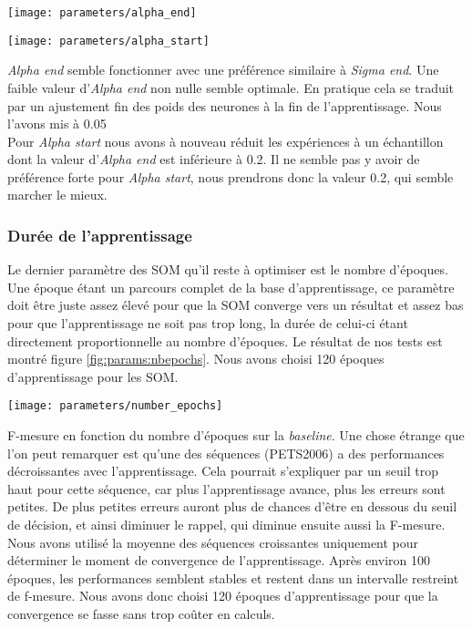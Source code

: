 	\begin{figureth}
		\begin{subfigureth}{.75\textwidth}
			\texttt{[image: parameters/alpha\_end]}	
		\end{subfigureth}
		\begin{subfigureth}{.75\textwidth}
			\texttt{[image: parameters/alpha\_start]}	
		\end{subfigureth}
		\caption[Optimisation d'$\alpha$]{\textit{Alpha end} semble fonctionner avec une préférence similaire à \textit{Sigma end}. Une faible valeur d'\textit{Alpha end} non nulle semble optimale. En pratique cela se traduit par un ajustement fin des poids des neurones à la fin de l'apprentissage. Nous l'avons mis à 0.05\\
		
		Pour \textit{Alpha start} nous avons à nouveau réduit les expériences à un échantillon dont la valeur d'\textit{Alpha end} est inférieure à 0.2. Il ne semble pas y avoir de préférence forte pour \textit{Alpha start}, nous prendrons donc la valeur 0.2, qui semble marcher le mieux.}\label{fig:params:alphaopt}
	\end{figureth}


	\subsubsection{Durée de l'apprentissage}

	Le dernier paramètre des SOM qu'il reste à optimiser est le nombre d'époques. Une époque étant un parcours complet de la base d'apprentissage, ce paramètre doit être juste assez élevé pour que la SOM converge vers un résultat et assez bas pour que l'apprentissage ne soit pas trop long, la durée de celui-ci étant directement proportionnelle au nombre d'époques. Le résultat de nos tests est montré figure \ref{fig:params:nbepochs}. Nous avons choisi 120 époques d'apprentissage pour les SOM.

	\begin{figureth}
		\texttt{[image: parameters/number\_epochs]}
		\caption[Nombre d'époques]{F-mesure en fonction du nombre d'époques sur la \textit{baseline}. Une chose étrange que l'on peut remarquer est qu'une des séquences (PETS2006) a des performances décroissantes avec l'apprentissage. Cela pourrait s'expliquer par un seuil trop haut pour cette séquence, car plus l'apprentissage avance, plus les erreurs sont petites. De plus petites erreurs auront plus de chances d'être en dessous du seuil de décision, et ainsi diminuer le rappel, qui diminue ensuite aussi la F-mesure. Nous avons utilisé la moyenne des séquences croissantes uniquement pour déterminer le moment de convergence de l'apprentissage. Après environ 100 époques, les performances semblent stables et restent dans un intervalle restreint de f-mesure. Nous avons donc choisi 120 époques d'apprentissage pour que la convergence se fasse sans trop coûter en calculs.}\label{fig:params:nbepochs}
	\end{figureth}

